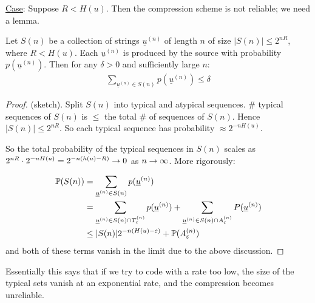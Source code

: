 \documentclass[]{article}
\newcommand{\un}{\underline{u}^{(n)}}
\newcommand{\ten}{T_\eps^{(n)}}
\newcommand{\aen}{A_\eps^{(n)}}
\begin{document}
\underline{Case}: Suppose $R < H(u)$. Then the compression scheme is not reliable; we need a lemma.

\begin{lemma}
    Let $S(n)$ be a collection of strings $\underline{u}^{(n)}$ of length $n$ of size $|S (n)| \le 2^{nR}$, where $R < H(u)$. Each $\underline{u}^{(n)}$ is produced by the source with probability $p(\underline{u}^{(n)})$. Then for any $\delta > 0$ and sufficiently large $n$:
    \begin{align*}
        \sum_{\underline{u}^{(n)}\in S(n)} p(\underline{u}^{(n)}) \le \delta
    \end{align*}
\end{lemma}
\begin{proof}(sketch). Split $S(n)$ into typical and atypical sequences.
    \# typical sequences of $S(n)$ is $\le $ the total \# of sequences of $S(n)$. Hence $|S(n)| \le 2^{nR}$. So each typical sequence has probability $\approx 2^{-nH(u)}$.

    So the total probability of the typical sequences in $S(n)$ scales as $2^{nR} \cdot 2^{-nH(u)} = 2^{-n(h(u) - R)} \rightarrow 0$ as $n\rightarrow \infty$. More rigorously:

    \begin{align*}
        \P(S(n)) &= \sum_{\underline{u}^{(n)} \in S(n)}p(\underline{u}^{(n)})\\
                 &= \sum_{\un \in S(n) \cap \ten}p(\un) + \sum_{\un \in S(n) \cap \aen}P(\un)\\
                 &\le |S(n)|2^{-n(H(u)-\eps)} + \P(\aen)
    \end{align*}
    and both of these terms vanish in the limit due to the above discussion.
\end{proof}

Essentially this says that if we try to code with a rate too low, the size of the typical sets vanish at an exponential rate, and the compression becomes unreliable.

\end{document}
